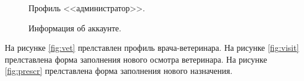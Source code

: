 \documentclass[a4paper,14pt]{article}
\begin{document}
\begin{figure}[!h]
	\caption{Профиль <<администратор>>.}
	\label{fig:admin}
\end{figure}

\begin{figure}[!h]
	\caption{Информация об аккаунте.}
	\label{fig:acc_info}
\end{figure}

\newpage
На рисунке \ref{fig:vet} прелставлен профиль врача-ветеринара. На рисунке \ref{fig:visit} прелставлена форма заполнения нового осмотра ветеринара. На рисунке \ref{fig:prescr} прелставлена форма заполнения нового назначения.
\end{document}
